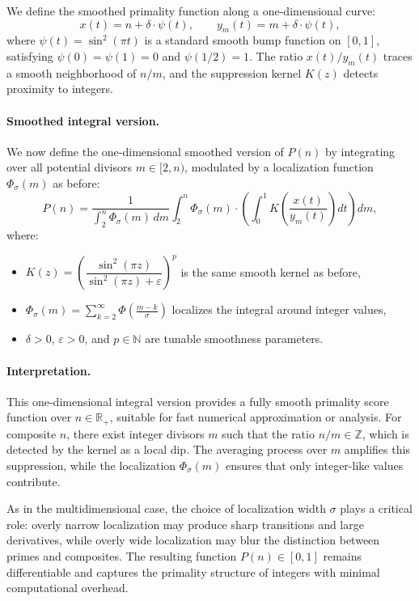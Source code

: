 \documentclass[12pt]{article}
\theoremstyle{definition}
\theoremstyle{plain}
\theoremstyle{remark}
\begin{document}
We define the smoothed primality function along a one-dimensional curve:
\[
x(t) = n + \delta \cdot \psi(t), \qquad y_m(t) = m + \delta \cdot \psi(t),
\]
where \( \psi(t) = \sin^2(\pi t) \) is a standard smooth bump function on \([0,1]\), satisfying \( \psi(0) = \psi(1) = 0 \) and \( \psi(1/2) = 1 \). The ratio \( x(t)/y_m(t) \) traces a smooth neighborhood of \( n/m \), and the suppression kernel \( K(z) \) detects proximity to integers.

\paragraph{Smoothed integral version.}

We now define the one-dimensional smoothed version of \( P(n) \) by integrating over all potential divisors \( m \in [2, n) \), modulated by a localization function \( \Phi_\sigma(m) \) as before:
\[
P(n) = \frac{1}{\int_2^n \Phi_\sigma(m)\, dm}
\int_2^n \Phi_\sigma(m) \cdot
\left( \int_0^1 K\left( \frac{x(t)}{y_m(t)} \right) dt \right) dm,
\]
where:
\begin{itemize}
  \item \( K(z) = \left( \dfrac{\sin^2(\pi z)}{\sin^2(\pi z) + \varepsilon} \right)^p \) is the same smooth kernel as before,
  \item \( \Phi_\sigma(m) = \sum_{k=2}^\infty \Phi\left( \frac{m - k}{\sigma} \right) \) localizes the integral around integer values,
  \item \( \delta > 0 \), \( \varepsilon > 0 \), and \( p \in \mathbb{N} \) are tunable smoothness parameters.
\end{itemize}

\paragraph{Interpretation.}

This one-dimensional integral version provides a fully smooth primality score function over \( n \in \mathbb{R}_+ \), suitable for fast numerical approximation or analysis. For composite \( n \), there exist integer divisors \( m \) such that the ratio \( n/m \in \mathbb{Z} \), which is detected by the kernel as a local dip. The averaging process over \( m \) amplifies this suppression, while the localization \( \Phi_\sigma(m) \) ensures that only integer-like values contribute.

As in the multidimensional case, the choice of localization width \( \sigma \) plays a critical role: overly narrow localization may produce sharp transitions and large derivatives, while overly wide localization may blur the distinction between primes and composites. The resulting function \( P(n) \in [0,1] \) remains differentiable and captures the primality structure of integers with minimal computational overhead.
\end{document}

